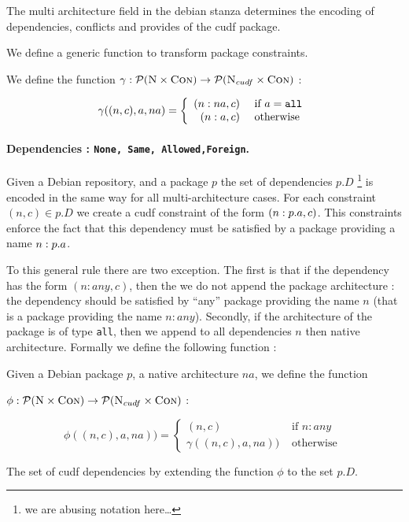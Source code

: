 The multi architecture field in the debian stanza determines the
encoding of dependencies, conflicts and provides of the cudf package.

We define a generic function to transform package constraints.
\begin{definition}
  We define the function 
  $\gamma : \mathcal{P}(\textsc{N}\times\textsc{Con}) \rightarrow \mathcal{P}(\textsc{N}_{cudf}\times\textsc{Con})$ :

  \[
    \gamma ((n,c),a,na) = \left\{ 
      \begin{array}{rl}
        (n:na,c) & \mbox{ if } a = \tt{all} \\
        (n:a,c)  & \mbox{ otherwise }
      \end{array} 
    \right.
  \]
\end{definition}

\paragraph{Dependencies : \texttt{None, Same, Allowed,Foreign}.}
Given a Debian repository, and a package $p$ the set of dependencies
$p.D$ \footnote{we are abusing notation here\ldots} is encoded in the
same way for all multi-architecture cases. For each constraint $(n,c)
\in p.D$ we create a cudf constraint of the form $(n:p.a,c)$. This
constraints enforce the fact that this dependency must be satisfied by
a package providing a name $n:p.a$.

To this general rule there are two exception. The first is that if the
dependency has the form $(n:any,c)$, then the we do not append the
package architecture : the dependency should be satisfied by ``any''
package providing the name $n$ (that is a package providing the name
$n:any$). Secondly, if the architecture of the package
is of type \texttt{all}, then we append to all dependencies $n$ then
native architecture. Formally we define the following function :

\begin{definition}
  Given a Debian package $p$, a native architecture $na$, we define
  the function 

  $\phi : \mathcal{P}(\textsc{N}\times\textsc{Con}) \rightarrow \mathcal{P}(\textsc{N}_{cudf}\times\textsc{Con})$ :

  \[
    \phi ((n,c),a,na)) = \left\{ 
      \begin{array}{rl}
        (n,c)               & \mbox{ if } n:any \\
        \gamma((n,c),a,na)) & \mbox{ otherwise }
      \end{array} 
    \right.
  \]

  The set of cudf dependencies by extending the function $\phi$ to the
  set $p.D$.
\end{definition}

